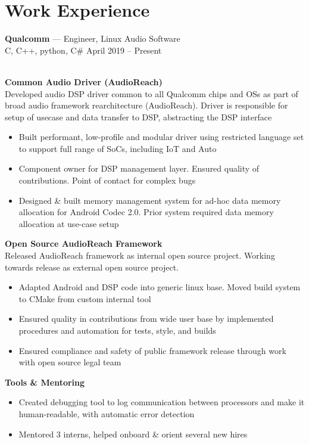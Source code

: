 \documentclass[letterpaper,10pt]{article}
\newcommand{\comment}[1]{}
\newcommand{\jobtitle}[4]{
    {\large \textbf{#1} --- #2\\}
    {\footnotesize#3 \hfill #4}
}
\begin{document}
\begin{minipage}[t]{0.6\textwidth} %


\section{Work Experience}
\medskip

\jobtitle{Qualcomm}{Engineer, Linux Audio Software}{C, C++, python, C\#}{April 2019 -- Present}
\smallskip
\\
\textbf{Common Audio Driver (AudioReach)}
\\
Developed audio DSP driver common to all Qualcomm chips and OSs as part of broad audio framework rearchitecture (AudioReach). Driver is responsible for setup of usecase and data transfer to DSP, abstracting the DSP interface

\begin{itemize}
    \item {Built performant, low-profile and modular driver using restricted language set to support full range of SoCs, including IoT and Auto}
    \item {Component owner for DSP management layer. Ensured quality of contributions. Point of contact for complex bugs} \comment{involving DSP + high level OS interactions}
    \item {Designed \& built memory management system for ad-hoc data memory allocation for Android Codec 2.0. Prior system required data memory allocation at use-case setup} 
\end{itemize}
\smallskip
\textbf{Open Source AudioReach Framework}
\\
Released AudioReach framework as internal open source project. Working towards release as external open source project.
\begin{itemize}
	\item {Adapted Android and DSP code into generic linux base. Moved build system to CMake from custom internal tool}
	\item {Ensured quality in contributions from wide user base by implemented procedures and automation for tests, style, and builds}
	\item {Ensured compliance and safety of public framework release through work with open source legal team}
\end{itemize}
\smallskip
\textbf{Tools \& Mentoring}
\begin{itemize}
    \item {Created debugging tool to log communication between processors and make it human-readable, with automatic error detection}
    \item {Mentored 3 interns, helped onboard \& orient several new hires}
\comment{TODO: Impact statements. Double indented list?}


\end{itemize}
\end{minipage}
\end{document}
